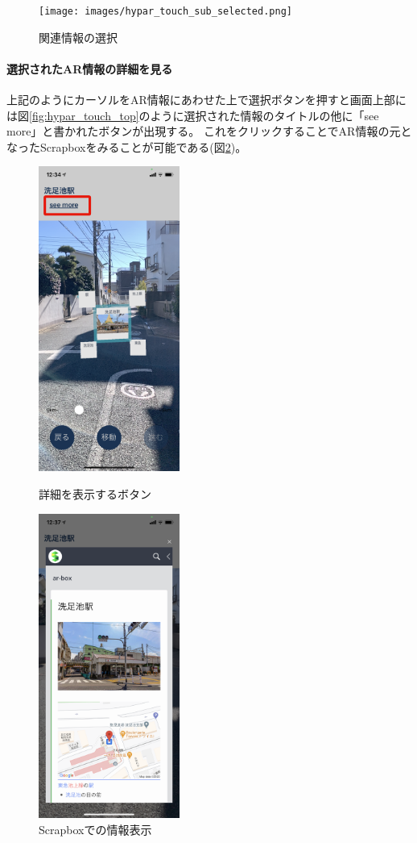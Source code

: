 \begin{figure}[h]
    \centering
    \texttt{[image: images/hypar\_touch\_sub\_selected.png]}
    \caption{関連情報の選択} \label{fig:hypar_touch_sub_selected}
\end{figure}


\paragraph*{選択されたAR情報の詳細を見る}
上記のようにカーソルをAR情報にあわせた上で選択ボタンを押すと画面上部には図\ref{fig:hypar_touch_top}のように選択された情報のタイトルの他に「see more」と書かれたボタンが出現する。
これをクリックすることでAR情報の元となったScrapboxをみることが可能である(図\ref{fig:hypar_touch_webview})。

\begin{figure}[h]
  \begin{minipage}{0.5\hsize}
    \centering
    \includegraphics[height=100mm]{images/hypar_touch_top.png}
    \caption{詳細を表示するボタン} \label{fig:hypar_touch_top}
  \end{minipage}
  \begin{minipage}{0.5\hsize}
    \centering
    \includegraphics[height=100mm]{images/hypar_touch_webview.png}
    \caption{Scrapboxでの情報表示} \label{fig:hypar_touch_webview}
  \end{minipage}
\end{figure}

